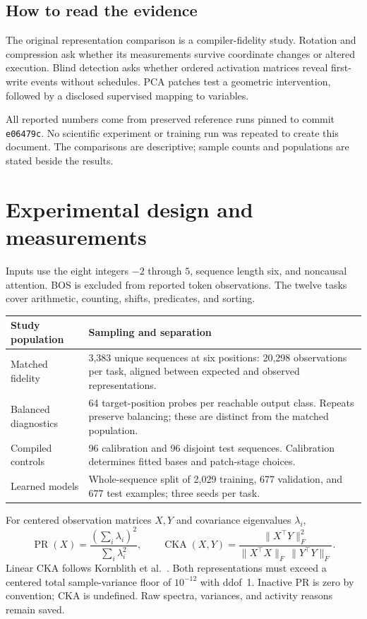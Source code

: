 \documentclass[11pt,a4paper]{article}
\newcommand{\newsection}[1]{\clearpage\section{#1}}
\begin{document}
\subsection*{How to read the evidence}
The original representation comparison is a compiler-fidelity study. Rotation and compression ask whether its measurements survive coordinate changes or altered execution. Blind detection asks whether ordered activation matrices reveal first-write events without schedules. PCA patches test a geometric intervention, followed by a disclosed supervised mapping to variables.

All reported numbers come from preserved reference runs pinned to commit \texttt{e06479c}. No scientific experiment or training run was repeated to create this document. The comparisons are descriptive; sample counts and populations are stated beside the results.

\newsection{Experimental design and measurements}
\label{sec:methods}
Inputs use the eight integers $-2$ through $5$, sequence length six, and noncausal attention. BOS is excluded from reported token observations. The twelve tasks cover arithmetic, counting, shifts, predicates, and sorting.


\begin{center}\small
\begin{tabularx}{\linewidth}{@{}P{.27\linewidth}X@{}}
\toprule
\textbf{Study population} & \textbf{Sampling and separation}\\
\midrule
Matched fidelity & 3,383 unique sequences at six positions: 20,298 observations per task, aligned between expected and observed representations.\\
Balanced diagnostics & 64 target-position probes per reachable output class. Repeats preserve balancing; these are distinct from the matched population.\\
Compiled controls & 96 calibration and 96 disjoint test sequences. Calibration determines fitted bases and patch-stage choices.\\
Learned models & Whole-sequence split of 2,029 training, 677 validation, and 677 test examples; three seeds per task.\\
\bottomrule
\end{tabularx}\end{center}

For centered observation matrices $X,Y$ and covariance eigenvalues $\lambda_i$,
\[
\operatorname{PR}(X)=\frac{(\sum_i\lambda_i)^2}{\sum_i\lambda_i^2},
\qquad
\operatorname{CKA}(X,Y)=\frac{\|X^\top Y\|_F^2}{\|X^\top X\|_F\,\|Y^\top Y\|_F}.
\]
Linear CKA follows Kornblith et al.~\cite{cka}. Both representations must exceed a centered total sample-variance floor of $10^{-12}$ with ddof~1. Inactive PR is zero by convention; CKA is undefined. Raw spectra, variances, and activity reasons remain saved.
\end{document}
